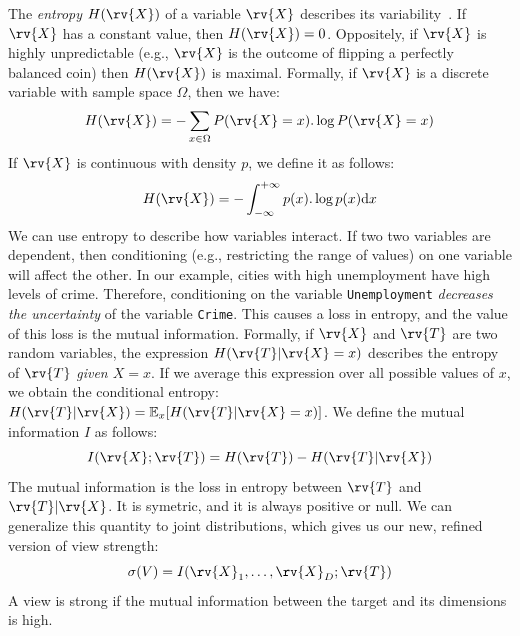 The \emph{entropy} $H(\rv{X})$ of a variable $\rv{X}$ describes its
variability~\cite{cover2012elements}. If $\rv{X}$ has a constant value, then $H(\rv{X}) = 0$.
Oppositely, if $\rv{X}$ is highly unpredictable (e.g., $\rv{X}$ is
the outcome of flipping a perfectly balanced coin) then $H(\rv{X})$ is
maximal. Formally, if $\rv{X}$ is a discrete variable with sample space
$\Omega$, then we have:
\begin{equation}\label{eq:ent-disc}
    H(\rv{X}) = - \sum_{x\in \Omega} P(\rv{X} = x).\log{P(\rv{X} = x)}
\end{equation}
If $\rv{X}$ is continuous with density $p$, we define it as follows:
\begin{equation}\label{eq:ent-cont}
    H(\rv{X}) = - \int_{-\infty}^{+\infty} p(x).\log{p(x)}\mathrm{d}x
\end{equation}
We can use entropy to describe how variables interact. If two two variables are
dependent, then conditioning (e.g., restricting the range of values) on one
variable will affect the other. In our example, cities with high unemployment
have high levels of crime.  Therefore, conditioning on the variable
\texttt{Unemployment} \emph{decreases the uncertainty} of the variable
\texttt{Crime}. This causes a loss in entropy, and the value of this loss is
the mutual information.  Formally, if $\rv{X}$ and $\rv{T}$ are two
random variables, the expression $H(\rv{T} | \rv{X} = x)$ describes the entropy
of $\rv{T}$ \emph{given $X = x$}. If we average this expression over all
possible values of $x$, we obtain the conditional entropy: $H(\rv{T}|\rv{X}) =
\mathbb{E}_{x} [H(\rv{T} | \rv{X} = x)]$. We define the mutual information $I$
as follows:
\begin{equation}\label{eq:mut-inf}
    I(\rv{X}; \rv{T}) = H(\rv{T}) - H(\rv{T} | \rv{X})
\end{equation}
The mutual information is the loss in entropy between $\rv{T}$ and $\rv{T} |
\rv{X}$. It is symetric, and it is always positive or null. We can generalize
this quantity to joint distributions, which gives us our new, refined version of
view strength:
\begin{equation}\label{eq:strength}
    \sigma(V) = I(\rv{X}_1, \ldots, \rv{X}_D ; \rv{T})
\end{equation}
A view is strong if the mutual information between the target and its
dimensions is high.

